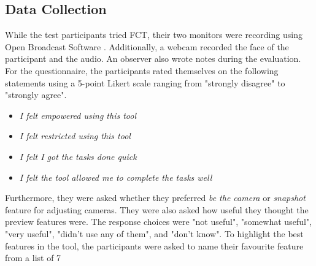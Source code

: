 \subsection{Data Collection}
While the test participants tried FCT, their two monitors were recording using Open Broadcast Software \cite{obs_cam}. Additionally, a webcam recorded the face of the participant and the audio. An observer also wrote notes during the evaluation. For the questionnaire, the participants rated themselves on the following statements using a 5-point Likert scale ranging from "strongly disagree" to "strongly agree". 
\begin{itemize}[noitemsep,nolistsep]
\item \textit{I felt empowered using this tool}
\item \textit{I felt restricted using this tool}
\item \textit{I felt I got the tasks done quick}
\item \textit{I felt the tool allowed me to complete the tasks well}
\end{itemize}
Furthermore, they were asked whether they preferred \textit{be the camera} or \textit{snapshot} feature for adjusting cameras. They were also asked how useful they thought the preview features were. The response choices were "not useful", "somewhat useful", "very useful", "didn't use any of them", and "don't know". To highlight the best features in the tool, the participants were asked to name their favourite feature from a list of 7
